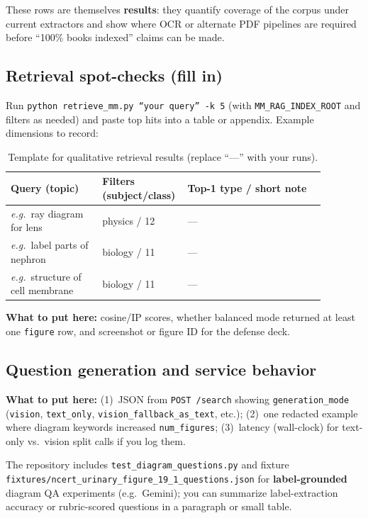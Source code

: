 \documentclass[11pt]{article}
\begin{document}
\noindent
These rows are themselves \textbf{results}: they quantify coverage of the corpus under current extractors and show where OCR or alternate PDF pipelines are required before ``100\% books indexed'' claims can be made.

\subsection{Retrieval spot-checks (fill in)}
\label{res:retrieve}

Run \texttt{python retrieve\_mm.py ``\emph{your query}'' -k 5} (with \texttt{MM\_RAG\_INDEX\_ROOT} and filters as needed) and paste top hits into a table or appendix. Example dimensions to record:

\begin{table}[H]
\centering
\small
\begin{tabular}{@{}p{0.28\linewidth}p{0.18\linewidth}p{0.42\linewidth}@{}}
\toprule
Query (topic) & Filters (subject/class) & Top-1 type / short note \\
\midrule
\textit{e.g.}\ ray diagram for lens & physics / 12 & --- \\
\textit{e.g.}\ label parts of nephron & biology / 11 & --- \\
\textit{e.g.}\ structure of cell membrane & biology / 11 & --- \\
\bottomrule
\end{tabular}
\caption{Template for qualitative retrieval results (replace ``---'' with your runs).}
\label{tab:retrieve-spot}
\end{table}

\noindent
\textbf{What to put here:} cosine/IP scores, whether balanced mode returned at least one \texttt{figure} row, and screenshot or figure ID for the defense deck.

\subsection{Question generation and service behavior}
\label{res:qg}

\textbf{What to put here:} (1)~JSON from \texttt{POST /search} showing \texttt{generation\_mode} (\texttt{vision}, \texttt{text\_only}, \texttt{vision\_fallback\_as\_text}, etc.); (2)~one redacted example where diagram keywords increased \texttt{num\_figures}; (3)~latency (wall-clock) for text-only vs.\ vision split calls if you log them.

\par
The repository includes \texttt{test\_diagram\_questions.py} and fixture \texttt{fixtures/ncert\_urinary\_figure\_19\_1\_questions.json} for \textbf{label-grounded} diagram QA experiments (e.g.\ Gemini); you can summarize label-extraction accuracy or rubric-scored questions in a paragraph or small table.
\end{document}
